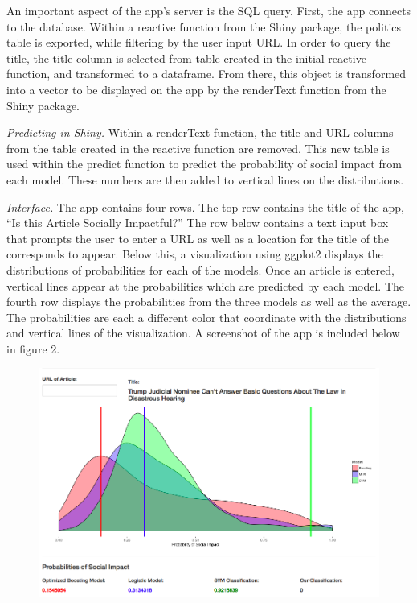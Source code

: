 \documentclass[10pt,letterpaper]{article}
\begin{document}
An important aspect of the app's server is the SQL query. First, the app
connects to the database. Within a reactive function from the Shiny
package, the politics table is exported, while filtering by the user
input URL. In order to query the title, the title column is selected
from table created in the initial reactive function, and transformed to
a dataframe. From there, this object is transformed into a vector to be
displayed on the app by the renderText function from the Shiny package.

\emph{Predicting in Shiny.} Within a renderText function, the title and
URL columns from the table created in the reactive function are removed.
This new table is used within the predict function to predict the
probability of social impact from each model. These numbers are then
added to vertical lines on the distributions.

\emph{Interface.} The app contains four rows. The top row contains the
title of the app, ``Is this Article Socially Impactful?'' The row below
contains a text input box that prompts the user to enter a URL as well
as a location for the title of the corresponds to appear. Below this, a
visualization using ggplot2 displays the distributions of probabilities
for each of the models. Once an article is entered, vertical lines
appear at the probabilities which are predicted by each model. The
fourth row displays the probabilities from the three models as well as
the average. The probabilities are each a different color that
coordinate with the distributions and vertical lines of the
visualization. A screenshot of the app is included below in figure 2.

\begin{figure}
\centering
\includegraphics{Screen Shot 2018-04-19 at 9.47.35 AM.png}
\caption{}
\end{figure}
\end{document}

